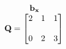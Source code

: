 \documentclass[preview]{standalone}
\begin{document}
\begin{align*}
\begin{array}{ccc}\begin{matrix}\hspace{1cm} \mathbf{b_{x}}  \quad \hspace{0.6cm} \end{matrix} \\ \mathbf{Q} = \begin{bmatrix} 2 & 1 & 1 \\ \\ 0 & 2 & 3 \end{bmatrix} \end{array}
\end{align*}
\end{document}
